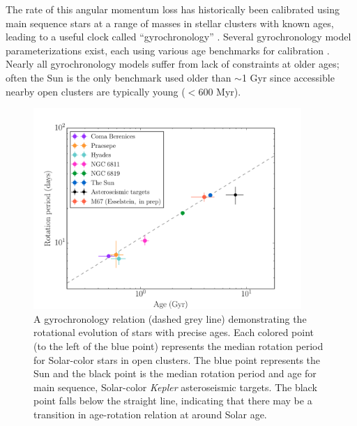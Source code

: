 \documentclass[12pt]{article}
\newcommand{\Kepler}{\textsl{Kepler}\xspace}
\newcommand{\eg}{{\it e.g.}}
\begin{document}
The rate of this angular momentum loss has historically been calibrated using
main sequence stars at a range of masses in stellar clusters with known ages,
leading to a useful clock called ``gyrochronology'' \citep{barnes2003}.
Several gyrochronology model parameterizations exist, each using various age
benchmarks for calibration \citep[\eg][]{Barnes2007, Barnes2010, Mamajek2008,
Angus2015, Matt2012, Vansaders2013, Vansaders2016}.
Nearly all gyrochronology models suffer from lack of constraints at older
ages; often the Sun is the only benchmark used older than $\sim$1 Gyr since
accessible nearby open clusters are typically young ($<600$ Myr).

\begin{figure}[!t]
\centering
\includegraphics[width=4in]{AAS_talk_M67_astero.pdf}
    \caption{A gyrochronology relation (dashed grey line) demonstrating the
    rotational evolution of stars with precise ages.
    Each colored point (to the left of the blue point) represents the median
    rotation period for Solar-color stars in open clusters.
    The blue point represents the Sun and the black point is the median
    rotation period and age for main sequence, Solar-color \Kepler
    asteroseismic targets.
    The black point falls below the straight line, indicating that there may
    be a transition in age-rotation relation at around Solar age.}
\label{fig:gyro}
\end{figure}
\end{document}

